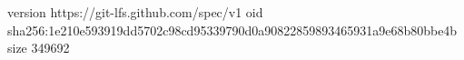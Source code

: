 version https://git-lfs.github.com/spec/v1
oid sha256:1e210e593919dd5702c98cd95339790d0a90822859893465931a9e68b80bbe4b
size 349692
